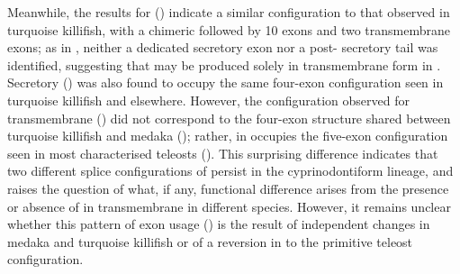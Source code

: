 Meanwhile, the results for  () indicate a similar configuration to that observed in turquoise killifish, with a chimeric  followed by 10 \cd{} exons and two transmembrane exons; as in \Nfu, neither a dedicated  secretory exon nor a post- secretory tail was identified, suggesting that  may be produced solely in transmembrane form in \Xma. Secretory  () was also found to occupy the same four-exon configuration seen in turquoise killifish and elsewhere. However, the configuration observed for transmembrane  () did not correspond to the four-exon structure shared between turquoise killifish and medaka (); rather,  in \Xma occupies the five-exon configuration seen in most characterised teleosts (). This surprising difference indicates that two different splice configurations of  persist in the cyprinodontiform lineage, and raises the question of what, if any, functional difference arises from the presence or absence of  in transmembrane  in different species. However, it remains unclear whether this pattern of exon usage () is the result of independent changes in medaka and turquoise killifish or of a reversion in \Xma to the primitive teleost configuration.
	
